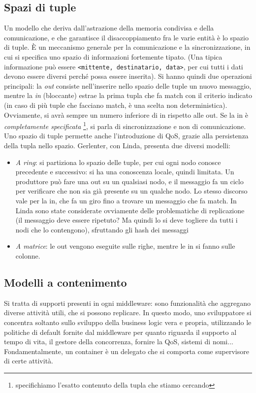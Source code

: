 \subsection{Spazi di tuple}
Un modello che deriva dall'astrazione della memoria condivisa e della comunicazione, e che garantisce il
disaccoppiamento fra le varie entità è lo spazio di tuple. È un meccanismo generale per la comunicazione e la
sincronizzazione, in cui si specifica uno spazio di informazioni fortemente tipato. (Una tipica informazione può essere
\texttt{<mittente, destinatario, data>}, per cui tutti i dati devono essere 
diversi perché possa essere inserita).
Si hanno quindi due operazioni principali: la \textit{out} consiste nell'inserire nello spazio delle tuple un nuovo
messaggio, mentre la \textit{in} (bloccante) estrae la prima tupla che fa match 
con il criterio indicato (in caso di più tuple che facciano match, è una scelta 
non deterministica). Ovviamente, si avrà sempre un numero inferiore di in 
rispetto alle out. Se la in è \textit{completamente specificata} 
\footnote{specifichiamo l'esatto contenuto della tupla che stiamo cercando}, si 
parla di sincronizzazione e non di comunicazione. Uno spazio di tuple permette 
anche l'introduzione di QoS, grazie alla persistenza della tupla nello spazio.
Gerlenter, con Linda, presenta due diversi modelli:
\begin{itemize}
 \item \textit{A ring}: si partiziona lo spazio delle tuple, per cui ogni nodo conosce precedente e successivo: si ha
 una conoscenza locale, quindi limitata. Un produttore può fare una out su un qualsiasi nodo, e il messaggio fa un
 ciclo per verificare che non sia già presente su un qualche nodo. Lo stesso discorso vale per la in, che fa un giro
 fino a trovare un messaggio che fa match. In Linda sono state considerate ovviamente delle problematiche di
 replicazione (il messaggio deve essere ripetuto? Ma quindi lo si deve togliere da tutti i nodi che lo contengono),
 sfruttando gli hash dei messaggi
 \item \textit{A matrice}: le out vengono eseguite sulle righe, mentre le in si fanno sulle colonne.
\end{itemize}
\subsection{Modelli a contenimento}
Si tratta di supporti presenti in ogni middleware: sono funzionalità che aggregano diverse attività utili, che si
possono replicare. In questo modo, uno sviluppatore si concentra soltanto sullo sviluppo della business logic vera e
propria, utilizzando le politiche di default fornite dal middleware per quanto riguarda il supporto al tempo di vita,
il gestore della concorrenza, fornire la QoS, sistemi di nomi... Fondamentalmente, un container è un delegato che si
comporta come supervisore di certe attività.
